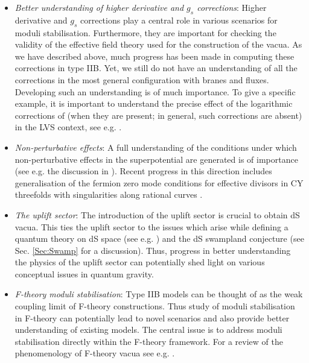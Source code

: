 \begin{itemize}
\item \textit{Better understanding of higher derivative and $g_s$ corrections}:  Higher derivative
and $g_s$ corrections play a central role in various scenarios for moduli stabilisation. Furthermore, they are important
for checking the validity of the effective field theory used for the construction of the vacua. As we have described above, much progress has
been made in computing these corrections in type IIB. Yet, we still do not have an understanding of all the corrections
in the most general configuration with branes and fluxes. Developing such an understanding is of much 
importance. To give a specific example, it is important to
understand the precise effect  of the logarithmic corrections of  \cite{Antoniadis:2018hqy, Antoniadis:2019rkh} (when they are present; in general, such corrections are absent) in the LVS context, see e.g. \cite{Conlon:2010ji, Junghans:2022exo, Gao:2022fdi}.

\item  \textit{Non-perturbative effects}:  A full understanding of the conditions under which non-perturbative effects in the superpotential are generated  is of importance (see e.g. the discussion in \cite{Sethi:2017phn, Kachru:2018aqn}). Recent progress in this direction includes generalisation of the fermion zero mode conditions  for effective divisors in CY threefolds with singularities along rational curves \cite{Gendler:2022qof}.

\item \textit{The uplift sector}: The introduction of the uplift sector is crucial to obtain dS vacua. This ties the uplift sector
to the  issues  which arise while defining a quantum theory on dS space (see e.g. \cite{Witten:2001kn, Banks:2012hx, Maltz:2016iaw}) and the dS swampland conjecture (see Sec. \ref{Sec:Swamp} for a discussion). Thus, progress in better understanding the physics of the uplift sector  can potentially shed light on various conceptual issues in quantum gravity.

\item  \textit{F-theory moduli stabilisation}: Type IIB models can be thought of as  the weak coupling limit of  F-theory constructions. Thus study of moduli stabilisation in F-theory can potentially lead to novel scenarios and also provide better understanding of existing models. The central issue is  to address moduli stabilisation directly within the F-theory framework. For a review of the phenomenology of F-theory vacua see e.g. \cite{Maharana:2012tu}.


\end{itemize}
